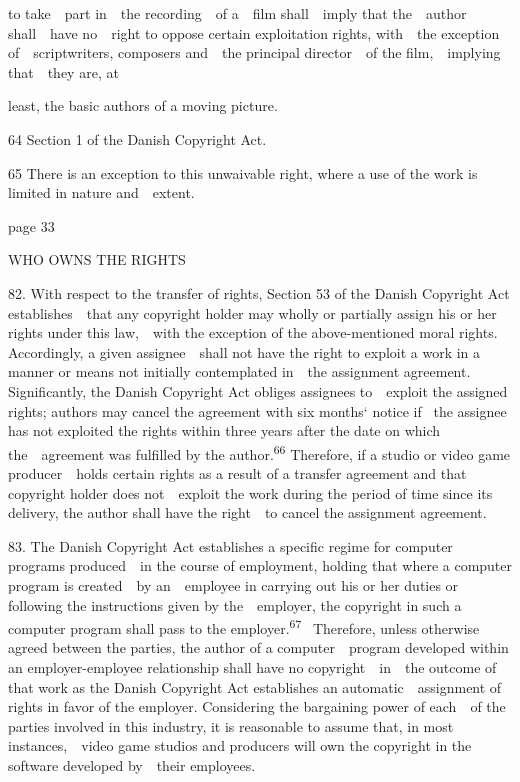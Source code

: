 \documentclass[
]{article}
\begin{document}
{to take~~part in~~the recording~~of a~~film shall~~imply that
the~~author shall~~have no~~right to oppose certain exploitation rights,
with~~the exception of~~scriptwriters, composers and~~the principal
director~~of the film,~~implying that~~they are, at}

{least, the basic authors of a moving picture.}

{64 }{Section 1 of the Danish }{Copyright Act}{.}

{65 }{There is an exception to this unwaivable right, where }{a use of
the work is limited in nature and~~extent}{.}

{page 33}

{WHO OWNS THE RIGHTS}

{82. }{With respect to the transfer of rights, Section 53 of the Danish
}{Copyright Act }{establishes~~that any copyright holder may wholly or
partially assign his or her rights under this law,~~with the exception
of the above-mentioned moral rights. Accordingly, a given
assignee~~shall not have the right to exploit a work in a manner or
means not initially contemplated in~~the assignment agreement.
Significantly, the Danish }{Copyright Act }{obliges assignees
to~~exploit the assigned rights; authors }{may cancel the agreement with
six months` notice if }{~the assignee has not exploited the rights
within three years after the date on which the~~agreement was fulfilled
by the author.}\textsuperscript{{66 }}{Therefore, if a studio or video
game producer~~holds certain rights as a result of a transfer agreement
and that copyright holder does not~~exploit the work during the period
of time since its delivery, the author shall have the right~~to cancel
the assignment agreement.}

{83. }{The Danish }{Copyright Act }{establishes a specific regime for
computer programs produced~~in the course of employment, holding that
where a computer program is created~~by an~~employee in carrying out his
or her duties or following the instructions given by the~~employer, the
copyright in such a computer program shall pass to the
employer.}\textsuperscript{{67 }}{~Therefore, unless otherwise agreed
between the parties, the author of a computer~~program developed within
an employer-employee relationship shall have no copyright~~in~~the
outcome of that work as the Danish }{Copyright Act }{establishes an
automatic~~assignment of rights in favor of the employer. Considering
the bargaining power of each~~of the parties involved in this industry,
it is reasonable to assume that, in most instances,~~video game studios
and producers will own the copyright in the software developed by~~their
employees.}
\end{document}
